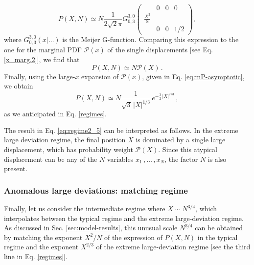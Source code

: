 \documentclass[aps,pre,twocolumn,superscriptaddress,showpacs]{revtex4-1}
\newcommand{\be}{\begin{equation}}
\newcommand{\ee}{\end{equation}}
\newcommand{\mP}{\mathcal{P}}
\begin{document}
\be
P(X,N)\simeq N \frac{1}{2\sqrt{2}\pi} G_{0,3}^{3,0} \left(\begin{array}{c|ccc} & 0 & 0 & 0 \\ \frac{ X^2}{8 }&  &  &  \\  & 0 & 0 & 1/2 \end{array}\right),
\ee
where $G_{0,3}^{3,0}(x|\ldots)$ is the Meijer G-function.
Comparing this expression to the one for the marginal PDF $\mP(x)$ of the single displacements [see Eq. \eqref{x_marg.2}], we find that
\be
P(X,N)\simeq N \mP(X)\,.
\label{eq:regime2_5}
\ee
Finally, using the large-$x$ expansion of $\mP(x)$, given in Eq. \eqref{eq:mP-asymptotic}, we obtain
\be
P(X,N)\simeq N  \frac{1 }{\sqrt{3}\,
  |X|^{1/3}}\, e^{-\frac{3}{2}\, {|X|}^{2/3}}\,,
\label{eq:regime2_6}
\ee
as we anticipated in Eq. \eqref{regimes}.

The result in Eq. \eqref{eq:regime2_5} can be interpreted as follows. In the extreme large deviation regime, the final position $X$ is dominated by a single large displacement, which has probability weight $\mP(X)$. Since this atypical displacement can be any of the $N$ variables $x_1\,,\ldots\,,x_N$, the factor $N$ is also present.

\subsubsection{Anomalous large deviations: matching regime}

Finally, let us consider the intermediate regime where $X\sim N^{3/4}$, which interpolates between the typical regime and the extreme large-deviation regime. As discussed in Sec. \ref{sec:model-results}, this unusual scale $N^{3/4}$ can be obtained by matching the exponent $X^2/N$ of the expression of $P(X,N)$ in the typical regime and the exponent $X^{2/3}$ of the extreme large-deviation regime [see the third line in Eq. \eqref{regimes}]. 
\end{document}

